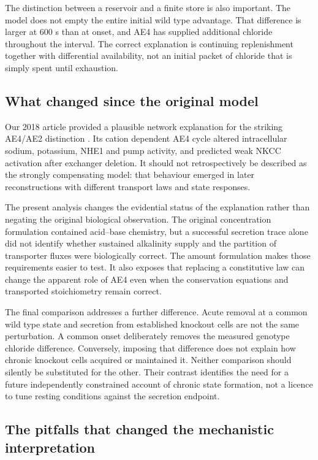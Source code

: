 \documentclass[11pt]{article}
\begin{document}
The distinction between a reservoir and a finite store is also important. The model does not empty the entire initial wild type advantage. That difference is larger at 600 s than at onset, and AE4 has supplied additional chloride throughout the interval. The correct explanation is continuing replenishment together with differential availability, not an initial packet of chloride that is simply spent until exhaustion.

\subsection{What changed since the original model}

Our 2018 article provided a plausible network explanation for the striking AE4/AE2 distinction \citep{VeraSiguenza2018}. Its cation dependent AE4 cycle altered intracellular sodium, potassium, NHE1 and pump activity, and predicted weak NKCC activation after exchanger deletion. It should not retrospectively be described as the strongly compensating model: that behaviour emerged in later reconstructions with different transport laws and state responses.

The present analysis changes the evidential status of the explanation rather than negating the original biological observation. The original concentration formulation contained acid--base chemistry, but a successful secretion trace alone did not identify whether sustained alkalinity supply and the partition of transporter fluxes were biologically correct. The amount formulation makes those requirements easier to test. It also exposes that replacing a constitutive law can change the apparent role of AE4 even when the conservation equations and transported stoichiometry remain correct.

The final comparison addresses a further difference. Acute removal at a common wild type state and secretion from established knockout cells are not the same perturbation. A common onset deliberately removes the measured genotype chloride difference. Conversely, imposing that difference does not explain how chronic knockout cells acquired or maintained it. Neither comparison should silently be substituted for the other. Their contrast identifies the need for a future independently constrained account of chronic state formation, not a licence to tune resting conditions against the secretion endpoint.

\subsection{The pitfalls that changed the mechanistic interpretation}
\label{sec:pitfalls}
\end{document}
